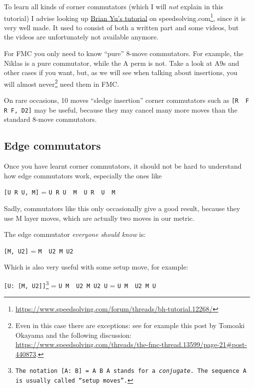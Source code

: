 \documentclass[11pt,a4paper]{book}
\newcommand{\p}{\textquotesingle}
\newcommand{\m}{\texttt}
\newcommand{\ps}{\p\,\,}
\begin{document}
To learn all kinds of corner commutators (which I will \emph{not} explain in this tutorial) I advise looking up \href{https://www.speedsolving.com/forum/threads/bh-tutorial.12268/}{Brian Yu's tutorial} on speedsolving.com\footnote{\url{https://www.speedsolving.com/forum/threads/bh-tutorial.12268/}}, since it is very well made. It used to consist of both a written part and some videos, but the videos are unfortunately not available anymore.

For FMC you only need to know ``pure'' 8-move commutators. For example, the Niklas is a pure commutator, while the A perm is not. Take a look at A9s and other cases if you want, but, as we will see when talking about insertions, you will almost never\footnote{Even in this case there are exceptions: see for example this post by Tomoaki Okayama and the following discussion: \url{https://www.speedsolving.com/threads/the-fmc-thread.13599/page-21\#post-440873}.} need them in FMC.

On rare occasions, 10 moves ``sledge insertion'' corner commutators such as \m{[R\ps F R F\p, D2]} may be useful, because they may cancel many more moves than the standard 8-move commutators.

\subsection{Edge commutators}

Once you have learnt corner commutators, it should not be hard to understand how edge commutators work, especially the ones like

\begin{center}
\m{[U R U\p, M\p]} = \m{U R U\ps M\ps U R\ps U\ps M}
\end{center}

Sadly, commutators like this only occasionally give a good result, because they use M layer moves, which are actually two moves in our metric.

The edge commutator \emph{everyone should know} is:

\begin{center}
\m{[M\p, U2]} = \m{M\ps U2 M U2}
\end{center}

Which is also very useful with some setup move, for example:

\begin{center}
\m{[U: [M\p, U2]]\footnote{The notation \m{[A: B]} = \m{A B A\p} stands for a \emph{conjugate}. The sequence \m A is usually called ``setup moves''.}} = \m{U M\ps U2 M U2 U\p} = \m{U M\ps U2 M U}
\end{center}
\end{document}
